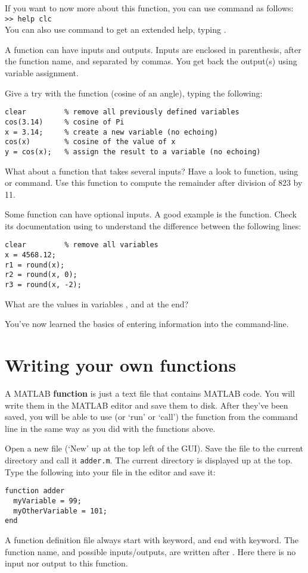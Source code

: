 \documentclass{article}
\begin{document}
If you want to now more about this function, you can use  command as follows: \\
\verb|>> help clc| \\
You can also use  command to get an extended help, typing .

A function can have inputs and outputs.
Inputs are enclosed in parenthesis, after the function name, and separated by commas.
You get back the output(s) using variable assignment.

Give a try with the  function (cosine of an angle), typing the following:
\begin{lstlisting}
clear         % remove all previously defined variables
cos(3.14)     % cosine of Pi
x = 3.14;     % create a new variable (no echoing)
cos(x)        % cosine of the value of x
y = cos(x);   % assign the result to a variable (no echoing)
\end{lstlisting}

What about a function that takes several inputs?
Have a look to  function, using  or  command.
Use this function to compute the remainder after division of 823 by 11.

Some function can have optional inputs.
A good example is the  function.
Check its documentation using  to understand the difference between the following lines:
\begin{lstlisting}
clear         % remove all variables
x = 4568.12;
r1 = round(x);
r2 = round(x, 0);
r3 = round(x, -2);
\end{lstlisting}
What are the values in variables ,  and  at the end?

You've now learned the basics of entering information into the command-line.

\section{Writing your own functions}

A MATLAB \textbf{function} is just a text file that contains MATLAB code.
You will write them in the MATLAB editor and save them to disk. 
After they've been saved, you will be able to use (or `run' or `call') the function from the command line in the same way as you did with the functions above. 

Open a new file (`New' up at the top left of the GUI). 
Save the file to the current directory and call it \verb|adder.m|.
The current directory is displayed up at the top. 
Type the following into your file in the editor and save it:
\begin{lstlisting}
function adder
  myVariable = 99;
  myOtherVariable = 101;
end
\end{lstlisting}
A function definition file always start with  keyword, and end with  keyword.
The function name, and possible inputs/outputs, are written after .
Here there is no input nor output to this function.
\end{document}
